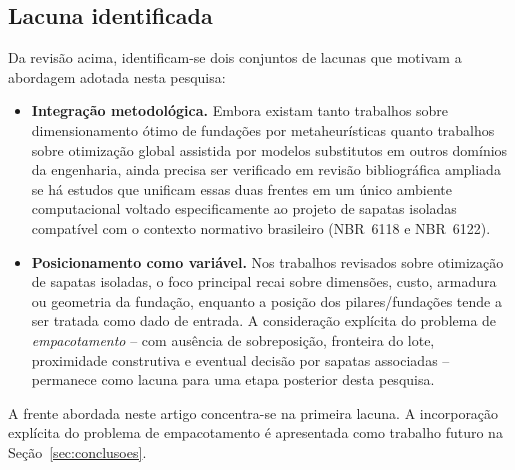 \subsection{Lacuna identificada}
\label{sec:soa_lacuna}

Da revisão acima, identificam-se dois conjuntos de lacunas que motivam a abordagem adotada nesta pesquisa:
\begin{itemize}
    \item \textbf{Integração metodológica.} Embora existam tanto trabalhos sobre dimensionamento ótimo de fundações por metaheurísticas quanto trabalhos sobre otimização global assistida por modelos substitutos em outros domínios da engenharia, ainda precisa ser verificado em revisão bibliográfica ampliada se há estudos que unificam essas duas frentes em um único ambiente computacional voltado especificamente ao projeto de sapatas isoladas compatível com o contexto normativo brasileiro (NBR~6118 e NBR~6122).
    \item \textbf{Posicionamento como variável.} Nos trabalhos revisados sobre otimização de sapatas isoladas, o foco principal recai sobre dimensões, custo, armadura ou geometria da fundação, enquanto a posição dos pilares/fundações tende a ser tratada como dado de entrada. A consideração explícita do problema de \textit{empacotamento} -- com ausência de sobreposição, fronteira do lote, proximidade construtiva e eventual decisão por sapatas associadas -- permanece como lacuna para uma etapa posterior desta pesquisa.
\end{itemize}

A frente abordada neste artigo concentra-se na primeira lacuna. A incorporação explícita do problema de empacotamento é apresentada como trabalho futuro na Seção~\ref{sec:conclusoes}.
